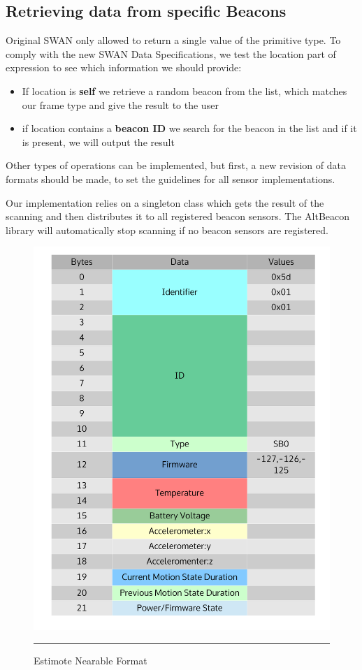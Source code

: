 \subsection{Retrieving data from specific Beacons}
Original SWAN only allowed to return a single value of the primitive type. To comply with the new SWAN Data Specifications, we test the location part of expression to see which information we should provide:

\begin{itemize}
 \item If location is \textbf{self} we retrieve a random beacon from the list, which matches our frame type and give the result to the user
 \item if location contains a \textbf{beacon ID} we search for the beacon in the list and if it is present, we will output the result
\end{itemize}

Other types of operations can be implemented, but first, a new revision of data formats should be made, to set the guidelines for all sensor implementations.

Our implementation relies on a singleton class which gets the result of the scanning and then distributes it to all registered beacon sensors. The AltBeacon library will automatically stop scanning
if no beacon sensors are registered.

\begin{figure}[htbp]
  \centering
    \includegraphics[scale=0.4]{Figures/data_format.pdf}
    \rule{35em}{0.5pt}
  \caption[Estimote Nearable Format]{Estimote Nearable Format}
  \label{fig:estimote_format}
\end{figure}

